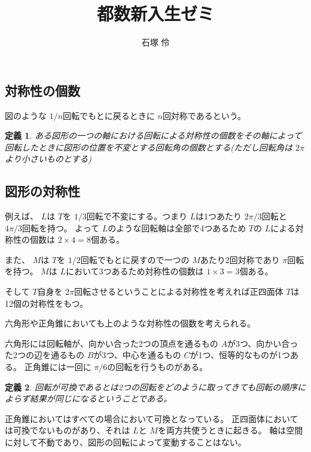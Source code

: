 \documentclass[dvipdfmx]{jsarticle}
\title{都数新入生ゼミ}
\author{石塚 伶}
\date{}
\begin{document}
\maketitle

\newtheorem{theo}{定理}
\newtheorem{defi}{定義}
\newtheorem{lemm}{補題}
\newtheorem{plob}{演習問題}

\subsection{対称性の個数}

図のような $1/n$回転でもとに戻るときに $n$回対称であるという。

\begin{defi}
ある図形の一つの軸における回転による対称性の個数をその軸によって回転したときに図形の位置を不変とする回転角の個数とする(ただし回転角は $2\pi$より小さいものとする)
\end{defi}

\subsection{図形の対称性}

例えば、 $L$は $T$を $1/3$回転で不変にする。つまり $L$は1つあたり $2\pi /3$回転と $4\pi /3$回転を持つ。
よって $L$のような回転軸は全部で4つあるため $T$の $L$による対称性の個数は $2 \times 4 = 8$個ある。

また、 $M$は $T$を $1/2$回転でもとに戻すので一つの $M$あたり2回対称であり $\pi$回転を持つ。 $M$は $L$において3つあるため対称性の個数は $1 \times 3 = 3$個ある。

そして $T$自身を $2\pi$回転させるということによる対称性を考えれば正四面体 $T$は12個の対称性をもつ。


六角形や正角錐においても上のような対称性の個数を考えられる。

六角形には回転軸が、向かい合った2つの頂点を通るもの $A$が3つ、向かい合った2つの辺を通るもの $B$が3つ、中心を通るもの $C$が1つ、恒等的なものが1つある。
正角錐には一回に $\pi /6$の回転を行うものがある。

\begin{defi}
回転が可換であるとは2つの回転をどのように取ってきても回転の順序によらず結果が同じになるということである。
\end{defi}

正角錐においてはすべての場合において可換となっている。
正四面体においては可換でないものがあり、それは $L$と $M$を両方共使うときに起きる。
軸は空間に対して不動であり、図形の回転によって変動することはない。
\end{document}

